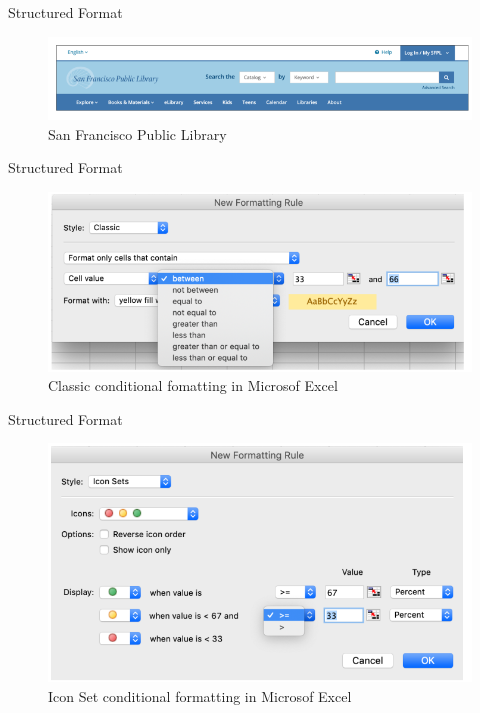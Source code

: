 \documentclass{beamer}
\begin{document}
\begin{frame}[t]{Structured Format}
	\begin{figure}[h]
		\centering
		\includegraphics[scale=0.6]{images/lec08-pic37.png}
		\caption{San Francisco Public Library}
	\end{figure}
\end{frame}

\begin{frame}[t]{Structured Format}
	\begin{figure}[h]
		\centering
		\includegraphics[scale=0.6]{images/lec08-pic38.png}
		\caption{Classic conditional fomatting in Microsof Excel}
	\end{figure}
\end{frame}

\begin{frame}[t]{Structured Format}
	\begin{figure}[h]
		\centering
		\includegraphics[scale=0.6]{images/lec08-pic39.png}
		\caption{Icon Set conditional formatting in Microsof Excel}
	\end{figure}
\end{frame}
\end{document}

